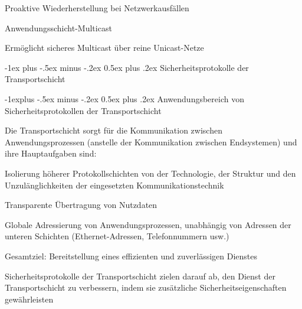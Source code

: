 \documentclass[a4paper]{article}
\makeatletter
\renewcommand{\section}{\@startsection{section}{1}{0mm}%
 {-1ex plus -.5ex minus -.2ex}%
 {0.5ex plus .2ex}%
 {\normalfont\large\bfseries}}
\renewcommand{\subsection}{\@startsection{subsection}{2}{0mm}%
 {-1explus -.5ex minus -.2ex}%
 {0.5ex plus .2ex}%
 {\normalfont\normalsize\bfseries}}
\makeatother
\begin{document}
\begin{multicols}{3}
\begin{itemize*}
\begin{itemize*}
                  \begin{itemize*}
                        \item Proaktive Wiederherstellung bei Netzwerkausfällen
                  \end{itemize*}
                  \item
                  Anwendungsschicht-Multicast

                  \begin{itemize*}
                        \item Ermöglicht sicheres Multicast über reine Unicast-Netze
                  \end{itemize*}
            \end{itemize*}


            \section{Sicherheitsprotokolle der
              Transportschicht}


            \subsection{Anwendungsbereich von Sicherheitsprotokollen der
                  Transportschicht}

            \begin{itemize*}
                  \item
                  Die Transportschicht sorgt für die Kommunikation zwischen
                  Anwendungsprozessen (anstelle der Kommunikation zwischen Endsystemen)
                  und ihre Hauptaufgaben sind:

                  \begin{itemize*}
                        \item Isolierung höherer Protokollschichten von der Technologie, der Struktur und den Unzulänglichkeiten der eingesetzten Kommunikationstechnik
                        \item Transparente Übertragung von Nutzdaten
                        \item Globale Adressierung von Anwendungsprozessen, unabhängig von Adressen der unteren Schichten (Ethernet-Adressen, Telefonnummern usw.)
                        \item Gesamtziel: Bereitstellung eines effizienten und zuverlässigen Dienstes
                  \end{itemize*}
                  \item
                  Sicherheitsprotokolle der Transportschicht zielen darauf ab, den
                  Dienst der Transportschicht zu verbessern, indem sie zusätzliche
                  Sicherheitseigenschaften gewährleisten


\end{itemize*}
\end{itemize*}
\end{multicols}
\end{document}
